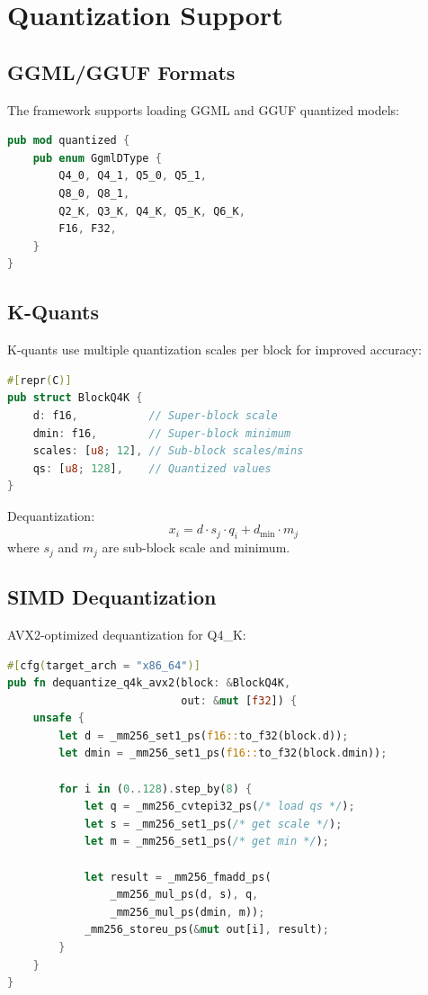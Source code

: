 \section{Quantization Support}


\subsection{GGML/GGUF Formats}

The framework supports loading GGML and GGUF quantized models:

\begin{lstlisting}[language=Rust]
pub mod quantized {
    pub enum GgmlDType {
        Q4_0, Q4_1, Q5_0, Q5_1,
        Q8_0, Q8_1,
        Q2_K, Q3_K, Q4_K, Q5_K, Q6_K,
        F16, F32,
    }
}
\end{lstlisting}

\subsection{K-Quants}

K-quants use multiple quantization scales per block for improved accuracy:

\begin{lstlisting}[language=Rust]
#[repr(C)]
pub struct BlockQ4K {
    d: f16,           // Super-block scale
    dmin: f16,        // Super-block minimum
    scales: [u8; 12], // Sub-block scales/mins
    qs: [u8; 128],    // Quantized values
}
\end{lstlisting}

Dequantization:
\begin{equation}
    x_i = d \cdot s_j \cdot q_i + d_{\min} \cdot m_j
\end{equation}
where $s_j$ and $m_j$ are sub-block scale and minimum.

\subsection{SIMD Dequantization}

AVX2-optimized dequantization for Q4\_K:

\begin{lstlisting}[language=Rust]
#[cfg(target_arch = "x86_64")]
pub fn dequantize_q4k_avx2(block: &BlockQ4K,
                           out: &mut [f32]) {
    unsafe {
        let d = _mm256_set1_ps(f16::to_f32(block.d));
        let dmin = _mm256_set1_ps(f16::to_f32(block.dmin));

        for i in (0..128).step_by(8) {
            let q = _mm256_cvtepi32_ps(/* load qs */);
            let s = _mm256_set1_ps(/* get scale */);
            let m = _mm256_set1_ps(/* get min */);

            let result = _mm256_fmadd_ps(
                _mm256_mul_ps(d, s), q,
                _mm256_mul_ps(dmin, m));
            _mm256_storeu_ps(&mut out[i], result);
        }
    }
}
\end{lstlisting}

